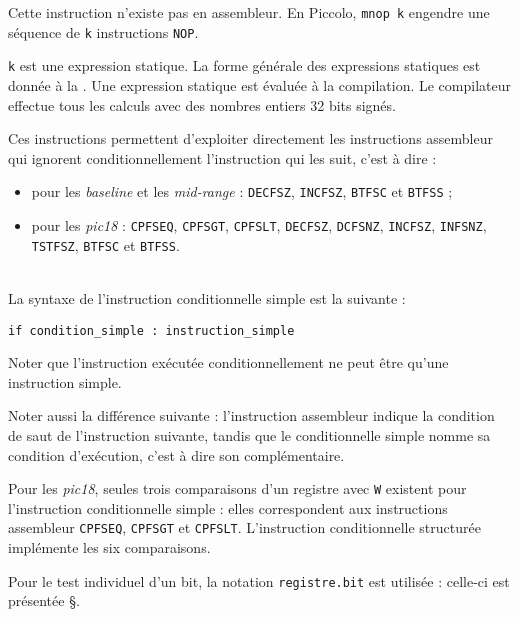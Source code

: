 
Cette instruction n'existe pas en assembleur. En Piccolo, \texttt{mnop k} engendre une séquence de \texttt{k} instructions \texttt{NOP}.

\texttt{k} est une expression statique. La forme générale des expressions statiques est donnée à la . Une expression statique est évaluée à la compilation. Le compilateur effectue tous les calculs avec des nombres entiers 32 bits signés.

Ces instructions permettent d'exploiter directement les instructions assembleur qui ignorent conditionnellement l'instruction qui les suit, c'est à dire :
\begin{itemize}
\item pour les \emph{baseline} et les \emph{mid-range} : \texttt{DECFSZ}, \texttt{INCFSZ}, \texttt{BTFSC} et \texttt{BTFSS} ;
\item pour les \emph{pic18} : \texttt{CPFSEQ}, \texttt{CPFSGT}, \texttt{CPFSLT}, \texttt{DECFSZ}, \texttt{DCFSNZ}, \texttt{INCFSZ}, \texttt{INFSNZ}, \texttt{TSTFSZ}, \texttt{BTFSC} et \texttt{BTFSS}.
\end{itemize}

~\\
La syntaxe de l'instruction conditionnelle simple est la suivante :

\begin{lstlisting}[language=piccolo]
if condition_simple : instruction_simple
\end{lstlisting}

Noter que l'instruction exécutée conditionnellement ne peut être qu'une instruction simple.

Noter aussi la différence suivante : l'instruction assembleur indique la condition de saut de l'instruction suivante, tandis que le conditionnelle simple nomme sa condition d'exécution, c'est à dire son complémentaire.

Pour les \emph{pic18}, seules trois comparaisons d'un registre avec \texttt{W} existent pour l'instruction conditionnelle simple : elles correspondent aux instructions assembleur \texttt{CPFSEQ}, \texttt{CPFSGT} et \texttt{CPFSLT}. L'instruction conditionnelle structurée implémente les six comparaisons.

Pour le test individuel d'un bit, la notation \texttt{registre.bit} est utilisée : celle-ci est présentée §.

